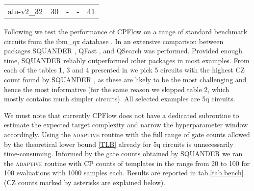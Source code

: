 \documentclass[twocolumn, amsfonts, amssymb, aps, nofootinbib]{revtex4-2}
\newcommand{\CZ}{CZ }
\newcommand{\CX}{CNOT }
\newcommand{\CP}{CP }
\newcommand{\package}[1]{\textrm {#1 }}
\newcommand{\cpflow}{\package{CPFlow}}
\newcommand{\adaptive}{\textsc{adaptive }}
\newcommand{\param}[1]{\texttt{#1}}
\begin{document}
\begin{table*}[]
\begin{tabular}{@{}ccccc@{}}
		alu-v2\_32            & 30      & -        & -       & 41                   
	\end{tabular}
\caption{\CX counts of circuits from imb\_qx set \cite{ibm_qx} synthesized with \cpflow, \package{SQUANDER}, \package{QSearch} and a hybrid combination \package{QFast+Qiskit+SQUANDER}. Bars indicate either a failure to synthesize a circuit or the absence of data. Results of \cpflow were obtained via the \adaptive routine with the following options: \param{min\_num\_cp\_gates}=20, \param{max\_num\_cp\_gates}=100, \param{num\_samples}=1000, \param{max\_evals}=100 except for the gate counts marked with an asterisk. The latter were obtained under a different option set: \param{min\_num\_cp\_gates}=40, \param{max\_num\_cp\_gates}=60, \param{num\_samples}=2000, \param{max\_evals}=100. Results of the other software packages are reproduced from \cite{Rakyta2022}.
}
\label{tab bench}
\end{table*}

Following \cite{Rakyta2022} we test the performance of \package{CPFlow} on a range of standard benchmark circuits from the ibm\_qx database \cite{Zulehner2019, ibm_qx}. In \cite{Rakyta2022} an extensive comparison between packages \package{SQUANDER}, \package{QFast}, and \package{QSearch} was performed. Provided enough time, \package{SQUANDER} reliably outperformed other packages in most examples. From each of the tables 1, 3 and 4 presented in \cite{Rakyta2022} we pick 5 circuits with the highest \CZ count found by \package{SQUANDER}, as these are likely to be the most challenging and hence the most informative (for the same reason we skipped table 2, which mostly contains much simpler circuits). All selected examples are 5q circuits. 

We must note that currently \cpflow does not have a dedicated subroutine to estimate the expected target complexity and narrow the hyperparameter window accordingly. Using the \adaptive routine with the full range of gate counts allowed by the theoretical lower bound \eqref{TLB} already for 5q circuits is unnecessarily time-consuming. Informed by the gate counts obtained by \package{SQUANDER} we ran the \adaptive routine with \CP counts of templates in the range from 20 to 100 for 100 evaluations with 1000 samples each. Results are reported in tab.\ref{tab bench} (\CZ counts marked by asterisks are explained below). 
\end{document}
